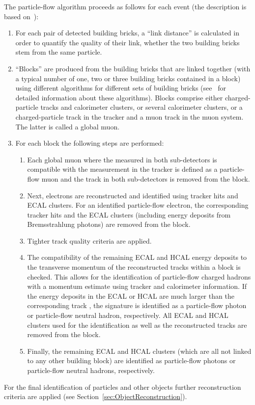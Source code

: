 The particle-flow algorithm proceeds as follows for each event (the description is based on~\cite{CMS-PAS-PFT-09-001}):
\begin{enumerate}
\item For each pair of detected building bricks, a ``link distance'' is calculated in order to quantify the quality of their link, \ie whether the two building bricks stem from the same particle. 
\item ``Blocks'' are produced from the building bricks that are linked together (with a typical number of one, two or three building bricks contained in a block) using different algorithms for different sets of building bricks (see~\cite{CMS-PAS-PFT-09-001} for detailed information about these algorithms).
      Blocks comprise either charged-particle tracks and calorimeter clusters, or several calorimeter clusters, or a charged-particle track in the tracker and a muon track in the muon system.
      The latter is called a global muon.
\item For each block the following steps are performed:
\begin{enumerate}
\item Each global muon where the \pt measured in both sub-detectors is compatible with the  \pt  measurement in the tracker is defined as a particle-flow muon and the track in both sub-detectors is removed from the block.
\item Next, electrons are reconstructed and identified using tracker hits and ECAL clusters. 
      For an identified particle-flow electron, the corresponding tracker hits and the ECAL clusters (including energy deposits from Bremsstrahlung photons) are removed from the block. 
\item Tighter track quality criteria are applied.
\item The compatibility of the remaining ECAL and HCAL energy deposits to the transverse momentum of the reconstructed tracks within a block is checked. 
      This allows for the identification of particle-flow charged hadrons with a momentum estimate using tracker and calorimeter information. 
      If the energy deposits in the ECAL or HCAL are much larger than the corresponding track \pt, the signature is identified as a particle-flow photon or particle-flow neutral hadron, respectively. 
      All ECAL and HCAL clusters used for the identification as well as the reconstructed tracks are removed from the block.
\item Finally, the remaining ECAL and HCAL clusters (which are all not linked to any other building block) are identified as particle-flow photons or particle-flow neutral hadrons, respectively.
\end{enumerate}
\end{enumerate}
For the final identification of particles and other objects further reconstruction criteria are applied (see Section~\ref{sec:ObjectReconstruction}).

